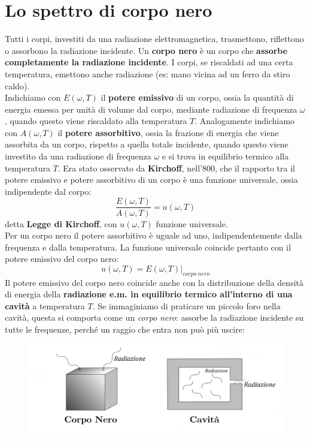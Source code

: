 \documentclass[a4paper,12pt,oneside]{book}
\begin{document}
\section{Lo spettro di corpo nero}
Tutti i corpi, investiti da una radiazione elettromagnetica, trasmettono, riflettono o assorbono la radiazione incidente. Un \textbf{corpo nero} è un corpo che \textbf{assorbe completamente la radiazione incidente}. I corpi, se riscaldati ad una certa temperatura, emettono anche radiazione (es: mano vicina ad un ferro da stiro caldo).\\
Indichiamo con $E(\omega , T) $ il \textbf{potere emissivo} di un corpo, ossia la quantità di energia emessa per unità di volume dal corpo, mediante radiazione di frequenza $\omega$, quando questo viene riscaldato alla temperatura $T$. Analogamente indichiamo con $A(\omega , T )$ il \textbf{potere assorbitivo}, ossia la frazione di energia che viene assorbita da un corpo, rispetto a quella totale incidente, quando questo viene investito da una radiazione di frequenza $\omega$ e si trova in equilibrio termico alla temperatura $T$.
Era stato osservato da \textbf{Kirchoff}, nell'800, che il rapporto tra il potere emissivo e potere assorbitivo di un corpo è una funzione universale, ossia indipendente dal corpo:
\begin{equation}
\frac{E(\omega ,T)}{A(\omega ,T)}= u(\omega , T)
\end{equation}
detta \textbf{Legge di Kirchoff}, con $u(\omega , T)$ funzione universale.\\
Per un corpo nero il potere assorbitivo è uguale ad uno, indipendentemente dalla frequenza e dalla temperatura. La funzione universale coincide pertanto con il potere emissivo del corpo nero:
\begin{equation}
u(\omega, T)= E(\omega , T)|_{corpo\ nero}
\end{equation}
Il potere emissivo del corpo nero coincide anche con la distribuzione della densità di energia della \textbf{radiazione e.m. in equilibrio termico all'interno di una cavità} a temperatura $T$. Se immaginiamo di praticare un piccolo foro nella cavità, questa si comporta come un \textit{corpo nero}: assorbe la radiazione incidente su tutte le frequenze, perché un raggio che entra non può più uscire:
\begin{figure}[!htbp]
\includegraphics[width=\textwidth]{immagini/cap_1/fig_1_1.png}
\end{figure}\\
\end{document}
